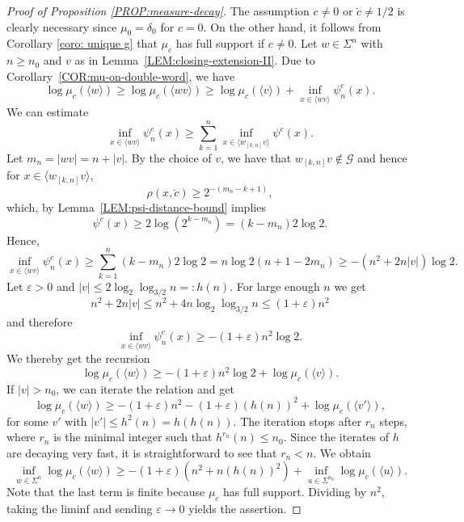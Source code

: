 \documentclass[11pt,reqno]{amsart}
\theoremstyle{plain}
\theoremstyle{definition}
\newcommand{\mc}{\mathcal}
\begin{document}
\begin{proof}[Proof of Proposition \ref{PROP:measure-decay}]
The assumption $c \neq 0$ or $\breve{c} \neq 1/2$ is clearly necessary since $\mu_{0} = \delta_0$ for $c = 0$. On the other hand, it follows from Corollary \ref{coro: unique g} that $\mu_{c}$ has full support if $c \neq 0$.
Let $w \in \Sigma^n$ with $n \geqslant n_0$ and $v$ as in Lemma~\ref{LEM:closing-extension-II}. Due to Corollary~\ref{COR:mu-on-double-word}, we have
\[
\log \mu_{c}(\langle w \rangle) \geqslant \log \mu_{c}(\langle wv\rangle)
\geqslant \log \mu_{c}(\langle v\rangle) + \inf_{x \in \langle wv\rangle} \psi^c_n(x).
\]
We can estimate
\[
\inf_{x \in \langle wv\rangle} \psi^c_n(x)
\geqslant \sum_{k=1}^n \inf_{x \in \langle w_{[k,n]}v\rangle} \psi^c(x). 
\]
Let $m_n = |wv| = n+|v|$.
By the choice of $v$, we have that $w_{[k,n]}v \notin \mc G$ and hence for $x \in \langle w_{[k,n]}v\rangle$,
\[
\rho(x,\breve{c}) \geqslant 2^{-(m_n -k+1)},
\]
which, by Lemma~\ref{LEM:psi-distance-bound} implies
\[
\psi^c(x) \geqslant 2 \log( 2^{k-m_n}) = (k-m_n) 2\log 2.
\]
Hence,
\[
\inf_{x \in \langle wv\rangle} \psi^c_n(x)
\geqslant \sum_{k=1}^n (k-m_n) 2\log 2
= n \log 2(n+1-2m_n)
\geqslant - (n^2+2n|v|) \log 2.
\]
Let $\varepsilon >0$ and $|v| \leqslant 2 \log_2 \log_{3/2} n =: h(n)$. For large enough $n$ we get
\[
 n^2+2n |v| \leqslant n^2 + 4 n \log_2 \log_{3/2}n
\leqslant (1+\varepsilon) n^2
\]
and therefore
\[
\inf_{x \in \langle wv\rangle} \psi^c_n(x)
\geqslant - (1+\varepsilon)n^2 \log 2.
\]
We thereby get the recursion
\[
\log \mu_{c}(\langle w \rangle) \geqslant - (1+ \varepsilon)n^2 \log 2 + \log \mu_{c}(\langle v\rangle).
\]
If $|v| > n_0$, we can iterate the relation and get
\[
\log \mu_{c}(\langle w \rangle) \geqslant - (1+\varepsilon)n^2 - (1+\varepsilon) (h(n))^2 + \log \mu_{c}(\langle v'\rangle),
\]
for some $v'$ with $|v'| \leqslant h^2(n) = h( h(n))$. The iteration stops after $r_n$ steps, where $r_n$ is the minimal integer such that $h^{r_n}(n) \leqslant n_0$. Since the iterates of $h$ are decaying very fast, it is straightforward to see that $r_n < n$. We obtain
\[
\inf_{w \in \Sigma^n} \log \mu_{c}(\langle w \rangle)
 \geqslant -(1+\varepsilon)(n^2 + n (h(n))^2 ) + \inf_{u \in \Sigma^{n_0}} \log \mu_{c}(\langle u\rangle).
\]
Note that the last term is finite because $\mu_{c}$ has full support.
Dividing by $n^2$, taking the liminf and sending $\varepsilon \to 0$ yields the assertion.
\end{proof}
\end{document}
